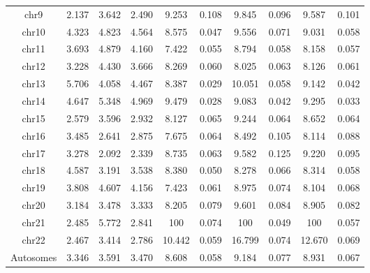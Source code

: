 \begin{table}[!h]
\begin{tabular}{|c|p{1.1cm}p{1.2cm}p{1.3cm}|cccccc|}
    chr9 & 2.137 & 3.642 & 2.490 & 9.253 & 0.108 & 9.845 & 0.096 & 9.587 & 0.101 \\
    chr10 & 4.323 & 4.823 & 4.564 & 8.575 & 0.047 & 9.556 & 0.071 & 9.031 & 0.058 \\
    chr11 & 3.693 & 4.879 & 4.160 & 7.422 & 0.055 & 8.794 & 0.058 & 8.158 & 0.057 \\
    chr12 & 3.228 & 4.430 & 3.666 & 8.269 & 0.060 & 8.025 & 0.063 & 8.126 & 0.061 \\
    chr13 & 5.706 & 4.058 & 4.467 & 8.387 & 0.029 & 10.051 & 0.058 & 9.142 & 0.042 \\
    chr14 & 4.647 & 5.348 & 4.969 & 9.479 & 0.028 & 9.083 & 0.042 & 9.295 & 0.033 \\
    chr15 & 2.579 & 3.596 & 2.932 & 8.127 & 0.065 & 9.244 & 0.064 & 8.652 & 0.064 \\
    chr16 & 3.485 & 2.641 & 2.875 & 7.675 & 0.064 & 8.492 & 0.105 & 8.114 & 0.088 \\
    chr17 & 3.278 & 2.092 & 2.339 & 8.735 & 0.063 & 9.582 & 0.125 & 9.220 & 0.095 \\
    chr18 & 4.587 & 3.191 & 3.538 & 8.380 & 0.050 & 8.278 & 0.066 & 8.314 & 0.058 \\
    chr19 & 3.808 & 4.607 & 4.156 & 7.423 & 0.061 & 8.975 & 0.074 & 8.104 & 0.068 \\
    chr20 & 3.184 & 3.478 & 3.333 & 8.205 & 0.079 & 9.601 & 0.084 & 8.905 & 0.082 \\
    chr21 & 2.485 & 5.772 & 2.841 & 100 & 0.074 & 100 & 0.049 & 100 & 0.057 \\
    chr22 & 2.467 & 3.414 & 2.786 & 10.442 & 0.059 & 16.799 & 0.074 & 12.670 & 0.069 \\
    Autosomes & 3.346 & 3.591 & 3.470 & 8.608 & 0.058 & 9.184 & 0.077 & 8.931 & 0.067 \\
    \hline \end{tabular}
\end{table}

